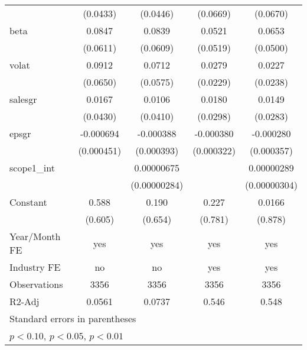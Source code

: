 \begin{table}[htbp]
\begin{tabular}{l*{4}{c}}
                    &    (0.0433)         &    (0.0446)         &    (0.0669)         &    (0.0670)         \\
[1em]
beta                &      0.0847         &      0.0839         &      0.0521         &      0.0653         \\
                    &    (0.0611)         &    (0.0609)         &    (0.0519)         &    (0.0500)         \\
[1em]
volat               &      0.0912         &      0.0712         &      0.0279         &      0.0227         \\
                    &    (0.0650)         &    (0.0575)         &    (0.0229)         &    (0.0238)         \\
[1em]
salesgr             &      0.0167         &      0.0106         &      0.0180         &      0.0149         \\
                    &    (0.0430)         &    (0.0410)         &    (0.0298)         &    (0.0283)         \\
[1em]
epsgr               &   -0.000694         &   -0.000388         &   -0.000380         &   -0.000280         \\
                    &  (0.000451)         &  (0.000393)         &  (0.000322)         &  (0.000357)         \\
[1em]
scope1\_int          &                     &  0.00000675\sym{**} &                     &  0.00000289         \\
                    &                     &(0.00000284)         &                     &(0.00000304)         \\
[1em]
Constant            &       0.588         &       0.190         &       0.227         &      0.0166         \\
                    &     (0.605)         &     (0.654)         &     (0.781)         &     (0.878)         \\
\hline
Year/Month FE       &         yes         &         yes         &         yes         &         yes         \\
Industry FE         &          no         &          no         &         yes         &         yes         \\
Observations        &        3356         &        3356         &        3356         &        3356         \\
R2-Adj              &      0.0561         &      0.0737         &       0.546         &       0.548         \\
\hline\hline
\multicolumn{5}{l}{\footnotesize Standard errors in parentheses}\\
\multicolumn{5}{l}{\footnotesize \sym{*} \(p<0.10\), \sym{**} \(p<0.05\), \sym{***} \(p<0.01\)}\\
\end{tabular}
\end{table}
